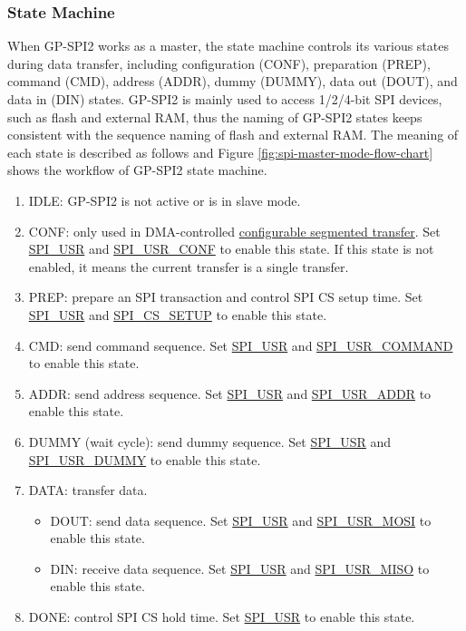 \documentclass[main\_\_EN.tex]{subfiles}
\begin{document}
\subsubsection{State Machine}
\label{sec:gp-spi2-state-machine}

When GP-SPI2 works as a master, the state machine controls its various states during data transfer, including configuration (CONF), preparation (PREP), command (CMD), address (ADDR), dummy (DUMMY), data out (DOUT), and data in (DIN) states. GP-SPI2 is mainly used to access 1/2/4-bit SPI devices, such as flash and external RAM, thus the naming of GP-SPI2 states keeps consistent with the sequence naming of flash and external RAM. The meaning of each state is described as follows and Figure \ref{fig:spi-master-mode-flow-chart} shows the workflow of GP-SPI2 state machine.

\begin{enumerate}
    \item IDLE: GP-SPI2 is not active or is in slave mode.
    \item CONF: only used in DMA-controlled \hyperref[sec:gp-spi-dma-seg-conf-trans]{configurable segmented transfer}. Set \hyperref[fielddesc:SPIUSR]{SPI\_USR} and \hyperref[fielddesc:SPIUSRCONF]{SPI\_USR\_CONF} to enable this state. If this state is not enabled, it means the current transfer is a single transfer.
    \item PREP: prepare an SPI transaction and control SPI CS setup time. Set \hyperref[fielddesc:SPIUSR]{SPI\_USR} and \hyperref[fielddesc:SPICSSETUP]{SPI\_CS\_SETUP} to enable this state.
    \item\label{phase:cmd} CMD: send command sequence. Set \hyperref[fielddesc:SPIUSR]{SPI\_USR} and \hyperref[fielddesc:SPIUSRCOMMAND]{SPI\_USR\_COMMAND} to enable this state.
    \item\label{phase:addr} ADDR: send address sequence. Set \hyperref[fielddesc:SPIUSR]{SPI\_USR} and \hyperref[fielddesc:SPIUSRADDR]{SPI\_USR\_ADDR} to enable this state.
    \item DUMMY (wait cycle): send dummy sequence. Set \hyperref[fielddesc:SPIUSR]{SPI\_USR} and \hyperref[fielddesc:SPIUSRDUMMY]{SPI\_USR\_DUMMY} to enable this state.
    \item\label{phase:data} DATA: transfer data.
    \begin{itemize}
    \item DOUT: send data sequence. Set \hyperref[fielddesc:SPIUSR]{SPI\_USR} and \hyperref[fielddesc:SPIUSRMOSI]{SPI\_USR\_MOSI} to enable this state.
    \item DIN: receive data sequence. Set \hyperref[fielddesc:SPIUSR]{SPI\_USR} and \hyperref[fielddesc:SPIUSRMISO]{SPI\_USR\_MISO} to enable this state.
    \end{itemize}
    \item DONE: control SPI CS hold time. Set \hyperref[fielddesc:SPIUSR]{SPI\_USR} to enable this state.
\end{enumerate}
\end{document}
